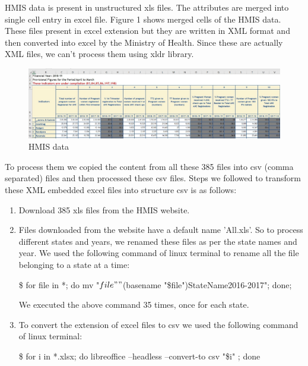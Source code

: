 \documentclass[12pt]{article}
\newenvironment{commandline}{
	\medskip
	\begin{mdframed}[style=commandline]
}{
	\end{mdframed}
	\medskip
}
\begin{document}
HMIS data is present in unstructured xls files. The attributes are merged into single cell entry in excel file. Figure 1 shows merged cells of the HMIS data. These files present in excel extension but they are written in XML format and then converted into excel by the Ministry of Health. Since these are actually XML files, we can't process them using xldr library.

\begin{figure}[h]
	\centering
	\includegraphics[scale=0.39]{images/hmisfile.jpeg}
	\caption{HMIS data}
\end{figure}

To process them we copied the content from all these 385 files into csv (comma separated) files and then processed these csv files. Steps we followed to transform these XML embedded excel files into structure csv is as follows:
\begin{enumerate}
	\item Download 385 xls files from the HMIS website.
	\item Files downloaded from the website have a default name 'All.xls'. So to process different states and years, we renamed these files as per the state names and year. We used the following command of linux terminal to rename all the file belonging to a state at a time: 
	 
	\begin{commandline}
	\$ for file in *; do mv "$file" "$(basename "\$file")StateName2016-2017"; done;
	\end{commandline} 
	
	We executed the above command 35 times, once for each state.
	
	\item To convert the extension of excel files to csv we used the following command of linux terminal:
	\begin{commandline}
	\$ for i   in *.xlsx; do  libreoffice --headless --convert-to csv "\$i" ; done
	\end{commandline}
	  
\end{enumerate}
\end{document}
